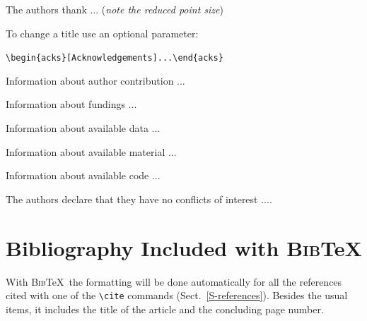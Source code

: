 \documentclass[namedreferences,hyperref,optionalrh]{spr-sola}
\newcommand{\BibTeX}{\textsc{Bib}\TeX}
\begin{document}
\begin{acks}
 The authors thank ... ({\it note the reduced point size})
\end{acks}

\noindent To change a title use an optional parameter:\par
\verb+\begin{acks}[Acknowledgements]...\end{acks}+




\appendix   


\begin{authorcontribution}
Information about author contribution ...
\end{authorcontribution}

\begin{fundinginformation}
Information about fundings ...
\end{fundinginformation}

\begin{dataavailability}
Information about available data ...
\end{dataavailability}

\begin{materialsavailability}
Information about available material ...
\end{materialsavailability}

\begin{codeavailability}
Information about available code ...
\end{codeavailability}

\begin{ethics}
\begin{conflict}
The authors declare that they have no conflicts of interest ....
\end{conflict}
\end{ethics}
  
  
\section*{Bibliography Included with \BibTeX } 
  With \BibTeX\ the formatting will be done automatically for all 
the references cited with one
of the \verb+\cite+ commands (Sect.~\ref{S-references}).
Besides the usual items, it includes the title of the article 
and the concluding page number. 
   
\end{document}
